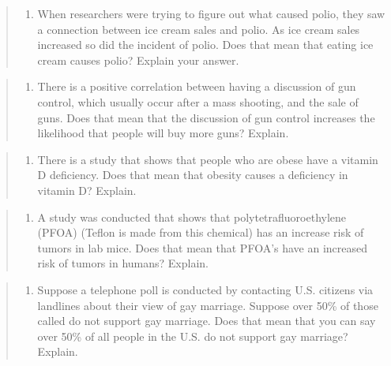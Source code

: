 \documentclass[]{book}
\providecommand{\tightlist}{%
  \setlength{\itemsep}{0pt}\setlength{\parskip}{0pt}}
\begin{document}
\begin{quote}
\begin{enumerate}
\def\labelenumi{\arabic{enumi}.}
\setcounter{enumi}{3}
\tightlist
\item
  When researchers were trying to figure out what caused polio, they saw a connection between ice cream sales and polio. As ice cream sales increased so did the incident of polio. Does that mean that eating ice cream causes polio? Explain your answer.
\end{enumerate}
\end{quote}

\begin{quote}
\begin{enumerate}
\def\labelenumi{\arabic{enumi}.}
\setcounter{enumi}{4}
\tightlist
\item
  There is a positive correlation between having a discussion of gun control, which usually occur after a mass shooting, and the sale of guns. Does that mean that the discussion of gun control increases the likelihood that people will buy more guns? Explain.
\end{enumerate}
\end{quote}

\begin{quote}
\begin{enumerate}
\def\labelenumi{\arabic{enumi}.}
\setcounter{enumi}{5}
\tightlist
\item
  There is a study that shows that people who are obese have a vitamin D deficiency. Does that mean that obesity causes a deficiency in vitamin D? Explain.
\end{enumerate}
\end{quote}

\begin{quote}
\begin{enumerate}
\def\labelenumi{\arabic{enumi}.}
\setcounter{enumi}{6}
\tightlist
\item
  A study was conducted that shows that polytetrafluoroethylene (PFOA) (Teflon is made from this chemical) has an increase risk of tumors in lab mice. Does that mean that PFOA's have an increased risk of tumors in humans? Explain.
\end{enumerate}
\end{quote}

\begin{quote}
\begin{enumerate}
\def\labelenumi{\arabic{enumi}.}
\setcounter{enumi}{7}
\tightlist
\item
  Suppose a telephone poll is conducted by contacting U.S. citizens via landlines about their view of gay marriage. Suppose over 50\% of those called do not support gay marriage. Does that mean that you can say over 50\% of all people in the U.S. do not support gay marriage? Explain.
\end{enumerate}
\end{quote}
\end{document}
